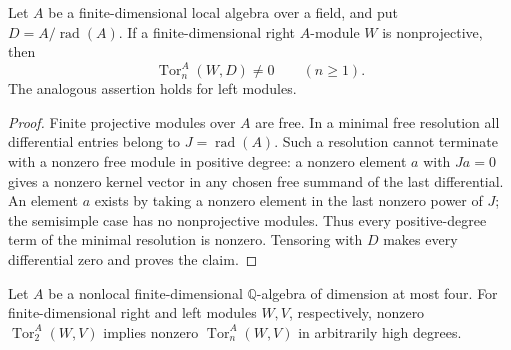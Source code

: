 \begin{lemma}
\label{B:local-minimal-Tor}
Let $A$ be a finite-dimensional local algebra over a field, and put
$D=A/\operatorname{rad}(A)$.  If a finite-dimensional right
$A$-module $W$ is nonprojective, then
\[
 \operatorname{Tor}_n^A(W,D)\ne0\qquad(n\geq1).
\]
The analogous assertion holds for left modules.
\end{lemma}

\begin{proof}
Finite projective modules over $A$ are free.  In a minimal free
resolution all differential entries belong to $J=\operatorname{rad}(A)$.
Such a resolution cannot terminate with a nonzero free module in
positive degree: a nonzero element $a$ with $Ja=0$ gives a nonzero
kernel vector in any chosen free summand of the last differential.
An element $a$ exists by taking a nonzero element in the last nonzero
power of $J$; the semisimple case has no nonprojective modules.
Thus every positive-degree term of the minimal resolution is nonzero.
Tensoring with $D$ makes every differential zero and proves the claim.
\end{proof}

\begin{lemma}
\label{B:nonlocal-four-Tor}
Let $A$ be a nonlocal finite-dimensional $\mathbb Q$-algebra of
dimension at most four.  For finite-dimensional right and left modules
$W,V$, respectively, nonzero $\operatorname{Tor}_2^A(W,V)$ implies
nonzero $\operatorname{Tor}_n^A(W,V)$ in arbitrarily high degrees.
\end{lemma}

